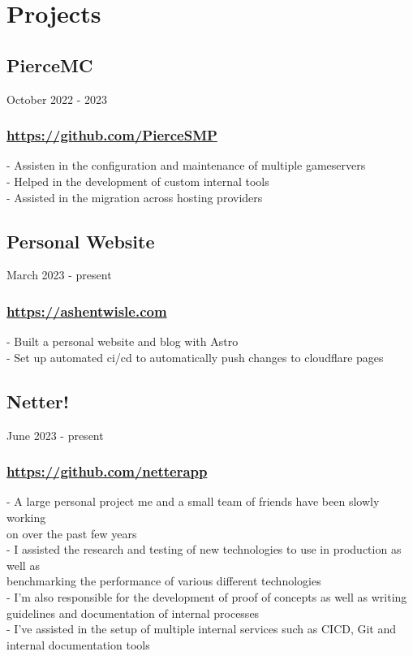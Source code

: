\newpage

\section{Projects}

\subsection{PierceMC} October 2022 - 2023 \\
\subsubsection{\href{https://github.com/PierceSMP}{https://github.com/PierceSMP}}
-\:  Assisten in the configuration and maintenance of multiple gameservers \\
-\:  Helped in the development of custom internal tools \\
-\:  Assisted in the migration across hosting providers \\

\subsection{Personal Website} March 2023 - present \\
\subsubsection{\href{https://ashentwisle.com}{https://ashentwisle.com}}
-\:  Built a personal website and blog with Astro \\
-\:  Set up automated ci/cd to automatically push changes to cloudflare pages \\

\subsection{Netter!} June 2023 - present \\
\subsubsection{\href{https://github.com/netterapp}{https://github.com/netterapp}}
-\:  A large personal project me and a small team of friends have been slowly working \\ 
\ind on over the past few years \\
-\:  I assisted the research and testing of new technologies to use in production as well as \\ 
\ind benchmarking the performance of various different technologies \\
-\:  I'm also responsible for the development of proof of concepts as well as writing \\ 
\ind guidelines and documentation of internal processes \\
-\:  I've assisted in the setup of multiple internal services such as CICD, Git and \\
\ind internal documentation tools\\

